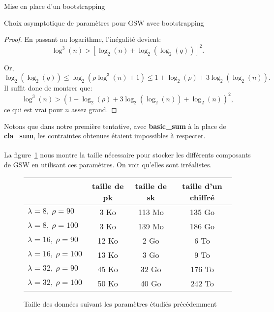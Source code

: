\begin{section}{Mise en place d'un bootstrapping}
\begin{subsection}{Choix asymptotique de paramètres pour GSW avec bootstrapping}
\begin{proof}
En passant au logarithme, l'inégalité devient:
\[ \log^3(n) > {\left[\log_2(n) + \log_2(\log_2(q))\right]}^2. \]

Or,
\[ \log_2(\log_2(q)) \leqslant \log_2(\rho \log^3(n) + 1) \leqslant 1 + \log_2(\rho) + 3 \log_2(\log_2(n)).\]
Il suffit donc de montrer que:
\[ \log^3(n) > {(1 + \log_2(\rho) + 3\log_2(\log_2(n)) + \log_2(n))}^2,\]
ce qui est vrai pour $n$ assez grand.
\end{proof}
\begin{rmq}
Notons que dans notre première tentative, avec \textbf{basic\_sum} à la place de \textbf{cla\_sum}, 
les contraintes obtenues étaient impossibles à respecter.
\end{rmq}

\paragraph{}
La figure~\ref{size_boostrapping} nous montre la taille nécessaire
pour stocker les différents composants de GSW en utilisant ces paramètres.
On voit qu'elles sont irréalistes.
\begin{figure}[!ht]
\begin{center}
\begin{tabular}{|l|c|c|c|}
\hline
& taille de pk & taille de sk& taille d'un chiffré \\
\hline
$\lambda = 8, \ \rho = 90$ & 3 Ko & 113 Mo & 135 Go \\
\hline
$\lambda = 8, \ \rho = 100$ & 3 Ko & 139 Mo & 186 Go \\
\hline
$\lambda = 16, \ \rho = 90$ & 12 Ko & 2 Go & 6 To \\
\hline
$\lambda = 16, \ \rho = 100$ & 13 Ko & 3 Go & 9 To \\
\hline
$\lambda = 32, \ \rho = 90$ & 45 Ko & 32 Go & 176 To \\
\hline
$\lambda = 32, \ \rho = 100$ & 50 Ko & 40 Go & 242 To \\
\hline
\end{tabular}
\caption{Taille des données suivant les paramètres étudiés précédemment}
\label{size_boostrapping}
\end{center}
\end{figure}

\end{subsection}
\end{section}
